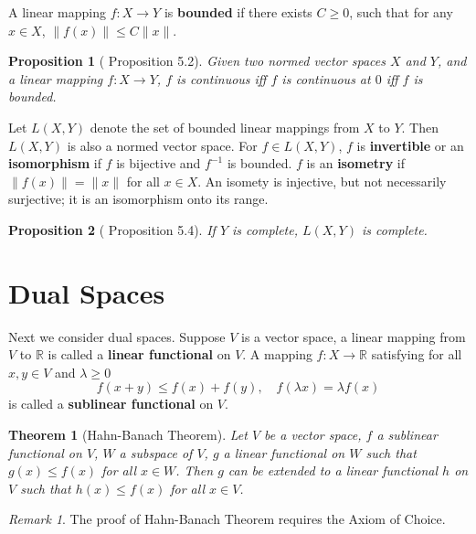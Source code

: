\documentclass[openany]{book}
\newtheorem{proposition}{Proposition}[chapter]
\newtheorem{theorem}{Theorem}[chapter]
\theoremstyle{definition}
\theoremstyle{remark}
\newtheorem*{remark}{Remark}
\begin{document}
A linear mapping $f:X\to Y$ is \textbf{bounded} if there exists $C\ge0$, such that for any $x\in X$, $\|f(x)\|\le C\|x\|$.
\begin{proposition}[\cite{F13} Proposition 5.2]
    Given two normed vector spaces $X$ and $Y$, and a linear mapping $f:X\to Y$, $f$ is continuous iff $f$ is continuous at $0$ iff $f$ is bounded.
\end{proposition}
Let $L(X,Y)$ denote the set of bounded linear mappings from $X$ to $Y$. Then $L(X,Y)$ is also a normed vector space. For $f\in L(X,Y)$, $f$ is \textbf{invertible} or an \textbf{isomorphism} if $f$ is bijective and $f^{-1}$ is bounded. $f$ is an \textbf{isometry} if $\|f(x)\|=\|x\|$ for all $x\in X$. An isomety is injective, but not necessarily surjective;  it is an isomorphism onto its range.
\begin{proposition}[\cite{F13} Proposition 5.4]
    If $Y$ is complete, $L(X,Y)$ is complete.
\end{proposition}

\section{Dual Spaces}
Next we consider dual spaces. Suppose $V$ is a vector space, a linear mapping from $V$ to $\mathbb{R}$ is called a \textbf{linear functional} on $V$. A mapping $f:X\to \mathbb{R}$ satisfying for all $x,y\in V$ and $\lambda\ge0$
\begin{equation*}
    f(x+y)\le f(x)+f(y),\quad f(\lambda x)=\lambda f(x)
\end{equation*}
is called a \textbf{sublinear functional} on $V$.
\begin{theorem}[Hahn-Banach Theorem]
    Let $V$ be a vector space, $f$ a sublinear functional on $V$, $W$ a subspace of $V$, $g$ a linear functional on $W$ such that $g(x)\le f(x)$ for all $x\in W$. Then $g$ can be extended to a linear functional $h$ on $V$ such that $h(x)\le f(x)$ for all $x\in V$.
\end{theorem}
\begin{remark}
    The proof of Hahn-Banach Theorem requires the Axiom of Choice.
\end{remark}
\end{document}
